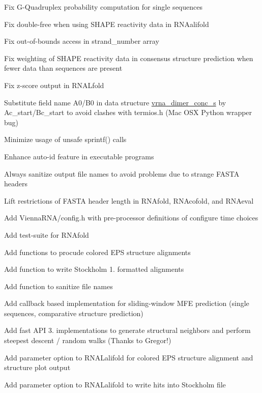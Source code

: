 \begin{DoxyItemize}
\item Fix G-\/\+Quadruplex probability computation for single sequences
\item Fix double-\/free when using S\+H\+A\+PE reactivity data in R\+N\+Aalifold
\item Fix out-\/of-\/bounds access in strand\+\_\+number array
\item Fix weighting of S\+H\+A\+PE reactivity data in consensus structure prediction when fewer data than sequences are present
\item Fix z-\/score output in R\+N\+A\+Lfold
\item Substitute field name \textquotesingle{}A0\textquotesingle{}/\textquotesingle{}B0\textquotesingle{} in data structure \mbox{\hyperlink{structvrna__dimer__conc__s}{vrna\+\_\+dimer\+\_\+conc\+\_\+s}} by \textquotesingle{}Ac\+\_\+start\textquotesingle{}/\textquotesingle{}Bc\+\_\+start\textquotesingle{} to avoid clashes with termios.\+h (Mac O\+SX Python wrapper bug)
\item Minimize usage of \textquotesingle{}unsafe\textquotesingle{} sprintf() calls
\item Enhance auto-\/id feature in executable programs
\item Always sanitize output file names to avoid problems due to strange F\+A\+S\+TA headers
\item Lift restrictions of F\+A\+S\+TA header length in R\+N\+Afold, R\+N\+Acofold, and R\+N\+Aeval
\item Add Vienna\+R\+N\+A/config.\+h with pre-\/processor definitions of configure time choices
\item Add test-\/suite for R\+N\+Afold
\item Add functions to procude colored E\+PS structure alignments
\item Add function to write Stockholm 1. formatted alignments
\item Add function to sanitize file names
\item Add callback based implementation for sliding-\/window M\+FE prediction (single sequences, comparative structure prediction)
\item Add fast A\+PI 3. implementations to generate structural neighbors and perform steepest descent / random walks (Thanks to Gregor!)
\item Add parameter option to R\+N\+A\+Lalifold for colored E\+PS structure alignment and structure plot output
\item Add parameter option to R\+N\+A\+Lalifold to write hits into Stockholm file

\end{DoxyItemize}
